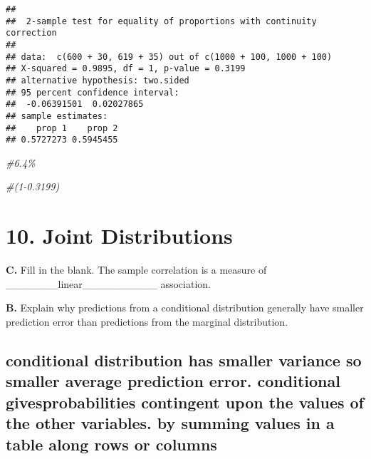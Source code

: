 \documentclass[
]{article}
\newenvironment{Shaded}{\begin{snugshade}}{\end{snugshade}}
\newcommand{\CommentTok}[1]{\textcolor[rgb]{0.56,0.35,0.01}{\textit{#1}}}
\begin{document}
\begin{verbatim}
## 
##  2-sample test for equality of proportions with continuity correction
## 
## data:  c(600 + 30, 619 + 35) out of c(1000 + 100, 1000 + 100)
## X-squared = 0.9895, df = 1, p-value = 0.3199
## alternative hypothesis: two.sided
## 95 percent confidence interval:
##  -0.06391501  0.02027865
## sample estimates:
##    prop 1    prop 2 
## 0.5727273 0.5945455
\end{verbatim}

\begin{Shaded}
\begin{Highlighting}[]
\CommentTok{\#6.4\%}
\end{Highlighting}
\end{Shaded}

\begin{Shaded}
\begin{Highlighting}[]
\CommentTok{\#(1{-}0.3199)}
\end{Highlighting}
\end{Shaded}

\hypertarget{joint-distributions}{%
\section{10. Joint Distributions}\label{joint-distributions}}

\textbf{C.} Fill in the blank. The sample correlation is a measure of
\_\_\_\_\_\_\_linear\_\_\_\_\_\_\_\_\_\_ association.

\textbf{B.} Explain why predictions from a conditional distribution
generally have smaller prediction error than predictions from the
marginal distribution.

\hypertarget{conditional-distribution-has-smaller-variance-so-smaller-average-prediction-error.-conditional-givesprobabilities-contingent-upon-the-values-of-the-other-variables.-by-summing-values-in-a-table-along-rows-or-columns}{%
\subsection{conditional distribution has smaller variance so smaller
average prediction error. conditional givesprobabilities contingent upon
the values of the other variables. by summing values in a table along
rows or
columns}\label{conditional-distribution-has-smaller-variance-so-smaller-average-prediction-error.-conditional-givesprobabilities-contingent-upon-the-values-of-the-other-variables.-by-summing-values-in-a-table-along-rows-or-columns}}
\end{document}
